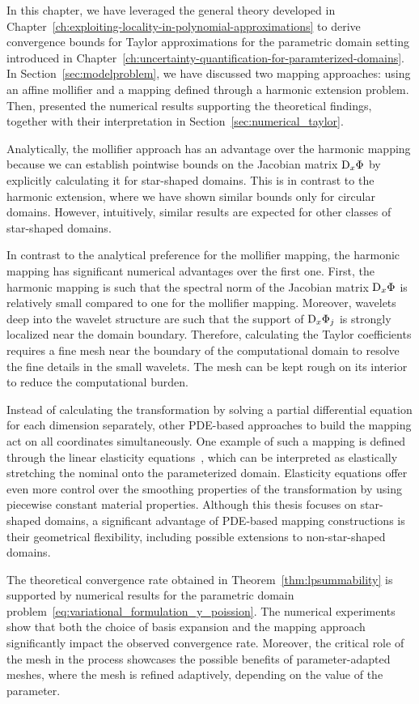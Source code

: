 In this chapter, we have leveraged the general theory developed in Chapter~\ref{ch:exploiting-locality-in-polynomial-approximations} to derive convergence bounds for Taylor approximations for the parametric domain setting introduced in Chapter~\ref{ch:uncertainty-quantification-for-paramterized-domains}.
In Section~\ref{sec:modelproblem}, we have discussed two mapping approaches: using an affine mollifier and a mapping defined through a harmonic extension problem.
Then, presented the numerical results supporting the theoretical findings, together with their interpretation in Section~\ref{sec:numerical_taylor}.

Analytically, the mollifier approach has an advantage over the harmonic mapping because we can establish pointwise bounds on the Jacobian matrix $\mathop{}\!\mathrm{D}_x\Phi$ by explicitly calculating it for star-shaped domains.
This is in contrast to the harmonic extension, where we have shown similar bounds only for circular domains.
However, intuitively, similar results are expected for other classes of star-shaped domains.

In contrast to the analytical preference for the mollifier mapping, the harmonic mapping has significant numerical advantages over the first one.
First, the harmonic mapping is such that the spectral norm of the Jacobian matrix $\mathop{}\!\mathrm{D}_x\Phi$ is relatively small compared to one for the mollifier mapping.
Moreover, wavelets deep into the wavelet structure are such that the support of $\mathop{}\!\mathrm{D}_x\Phi_j$ is strongly localized near the domain boundary.
Therefore, calculating the Taylor coefficients requires a fine mesh near the boundary of the computational domain to resolve the fine details in the small wavelets.
The mesh can be kept rough on its interior to reduce the computational burden.

Instead of calculating the transformation by solving a partial differential equation for each dimension separately, other PDE-based approaches to build the mapping act on all coordinates simultaneously.
One example of such a mapping is defined through the linear elasticity equations~\cite{cizmas2008,dwight2009}, which can be interpreted as elastically stretching the nominal onto the parameterized domain.
Elasticity equations offer even more control over the smoothing properties of the transformation by using piecewise constant material properties.
Although this thesis focuses on star-shaped domains, a significant advantage of PDE-based mapping constructions is their geometrical flexibility, including possible extensions to non-star-shaped domains.

The theoretical convergence rate obtained in Theorem~\ref{thm:lpsummability} is supported by numerical results for the parametric domain problem~\eqref{eq:variational_formulation_y_poission}.
The numerical experiments show that both the choice of basis expansion and the mapping approach significantly impact the observed convergence rate.
Moreover, the critical role of the mesh in the process showcases the possible benefits of parameter-adapted meshes, where the mesh is refined adaptively, depending on the value of the parameter.
